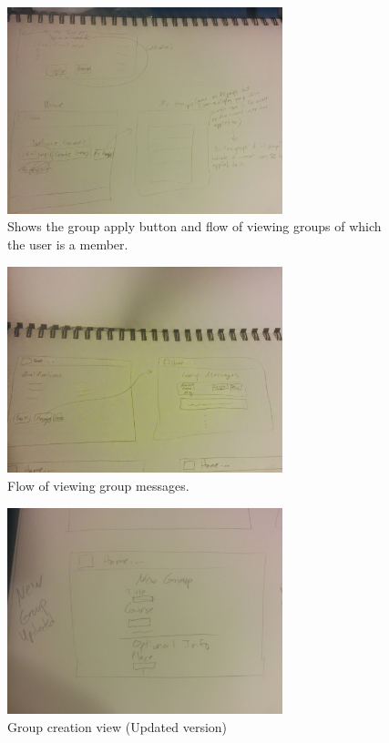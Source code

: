 \documentclass[conference]{IEEEtran}
\begin{document}
\begin{figure}[ht!]
\centering
\includegraphics[width=80mm]{figures/applyandGroupsFlowSketch}
\caption{Shows the group apply button and flow of viewing groups of which the user is a member. \label{fig:applyandGroupsFlowSketch}}
\end{figure}

\begin{figure}[ht!]
\centering
\includegraphics[width=80mm]{figures/messagesSketch}
\caption{Flow of viewing group messages. \label{fig:messagesSketch}}
\end{figure}

\begin{figure}[ht!]
\centering
\includegraphics[width=80mm]{figures/newGroupSketch}
\caption{Group creation view (Updated version) \label{fig:newGroupSketch}}
\end{figure}
\end{document}
